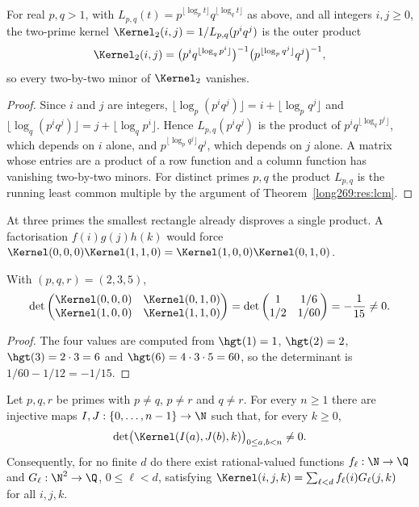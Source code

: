 \begin{proposition}\label{long269:res:two-prime-rank}
For real $p,q>1$, with $L_{p,q}(t)=p^{\lfloor\log_p t\rfloor}q^{\lfloor\log_q t\rfloor}$
as above, and all integers $i,j\ge0$, the two-prime kernel
$\Kernel_2(i,j)=1/L_{p,q}(p^iq^j)$ is the outer product
\[
 \Kernel_2(i,j)
 =\bigl(p^{i}q^{\lfloor\log_q p^{i}\rfloor}\bigr)^{-1}
  \bigl(p^{\lfloor\log_p q^{j}\rfloor}q^{j}\bigr)^{-1},
\]
so every two-by-two minor of $\Kernel_2$ vanishes.
\end{proposition}

\begin{proof}
Since $i$ and $j$ are integers,
$\lfloor\log_p(p^iq^j)\rfloor=i+\lfloor\log_p q^{j}\rfloor$ and
$\lfloor\log_q(p^iq^j)\rfloor=j+\lfloor\log_q p^{i}\rfloor$.  Hence
$L_{p,q}(p^iq^j)$ is the product of $p^{i}q^{\lfloor\log_q p^{i}\rfloor}$,
which depends on $i$ alone, and $p^{\lfloor\log_p q^{j}\rfloor}q^{j}$, which
depends on $j$ alone.  A matrix whose entries are a product of a row function
and a column function has vanishing two-by-two minors.  For distinct primes
$p,q$ the product $L_{p,q}$ is the running least common multiple by the
argument of Theorem~\ref{long269:res:lcm}.
\end{proof}


At three primes the smallest rectangle already disproves a single
product. A factorisation $f(i)g(j)h(k)$ would force
$\Kernel(0,0,0)\Kernel(1,1,0)=\Kernel(1,0,0)\Kernel(0,1,0)$.

\begin{proposition}\label{long269:res:rank}
With $(p,q,r)=(2,3,5)$,
\[
 \det\begin{pmatrix}
 \Kernel(0,0,0)&\Kernel(0,1,0)\\
 \Kernel(1,0,0)&\Kernel(1,1,0)
 \end{pmatrix}
 =\det\begin{pmatrix}1&1/6\\1/2&1/60\end{pmatrix}
 =-\frac1{15}\ne0 .
\]
\end{proposition}

\begin{proof}
The four values are computed from $\hgt(1)=1$, $\hgt(2)=2$,
$\hgt(3)=2\cdot3=6$ and $\hgt(6)=4\cdot3\cdot5=60$, so the determinant is
$1/60-1/12=-1/15$.
\end{proof}


\begin{theorem}\label{long269:res:infinite-rank}
\label{long269:res:lead-infinite-rank}
Let $p,q,r$ be primes with $p\ne q$, $p\ne r$ and $q\ne r$.  For every
$n\ge1$ there are injective maps $I,J:\{0,\ldots,n-1\}\to\N$ such that, for
every $k\ge0$,
\[
 \det\bigl(\Kernel(I(a),J(b),k)\bigr)_{0\le a,b<n}\ne0 .
\]
Consequently, for no finite $d$ do there exist rational-valued functions
$f_\ell:\N\to\Q$ and $G_\ell:\N^{2}\to\Q$, $0\le\ell<d$, satisfying
$\Kernel(i,j,k)=\sum_{\ell<d}f_\ell(i)G_\ell(j,k)$ for all $i,j,k$.
\end{theorem}

